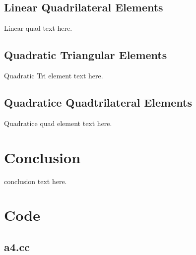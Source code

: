 \documentclass[a4paper, 12pt]{article}
\begin{document}
\subsection{Linear Quadrilateral Elements} \label{subsec:linQuad}
Linear quad text here.

\subsection{Quadratic Triangular Elements} \label{subsec:quadTri}
Quadratic Tri element text here.

\subsection{Quadratice Quadtrilateral Elements} \label{subsec:quadQuad}
Quadratice quad element text here.

\section{Conclusion} \label{sec:conclusion}
conclusion text here.

\newpage
\appendix
\section{Code} \label{sec:code}

\subsection{a4.cc} \label{subsec:main_cpp}


\end{document}
